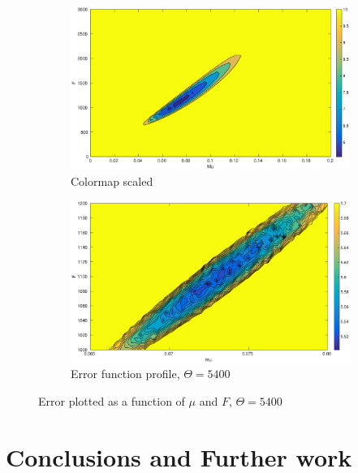 \documentclass[10pt,journal]{./IEEE_latex_class/IEEEtran}
\begin{document}
 \begin{figure}[h]	
	\begin{subfigure}[h]{0.49\textwidth}
    \centering
        \includegraphics[scale = 0.23 ,clip = true, trim = 85 0 0 0]{Likelihood_profile_rough}
        \caption{ Colormap scaled }
        \label{Likelihood_profile_rough} 
    \end{subfigure}
    	\begin{subfigure}[h]{0.49\textwidth}
    \centering
        \includegraphics[scale = 0.23 ,clip = true, trim = 85 0 0 0]{Likelihood_profile_fine}
        \caption{ Error function profile, $\Theta = 5400$}
        \label{Likelihood_profile_fine} 
    \end{subfigure}
    \caption{Error plotted as a function of $\mu$ and $F$, $\Theta = 5400$} 
\label{SimplifiedModelLikelihood}   
\end{figure}
  
\section{Conclusions and Further work}
\label{Conclusions and Further work}
\end{document}

